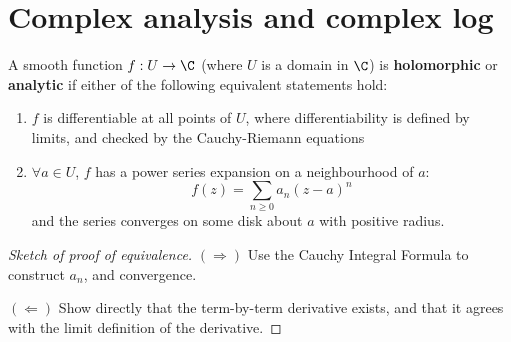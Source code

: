 \documentclass{article}
\begin{document}
\maketitle

\section{Complex analysis and complex log}

\begin{defi}
    A smooth function $f: U \to \C$ (where $U$ is a domain in $\C$) is \textbf{holomorphic} or \textbf{analytic} if either of the following equivalent statements hold:
    \begin{enumerate}[label=(\arabic*)]
        \item $f$ is differentiable at all points of $U$, where differentiability is defined by limits, and checked by the Cauchy-Riemann equations
        \item $\forall a \in U$, $f$ has a power series expansion on a neighbourhood of $a$:
            \begin{equation*}
                f(z) = \sum_{n \geq 0} a_n (z - a)^n
            \end{equation*}
            and the series converges on some disk about $a$ with positive radius.
    \end{enumerate}
\end{defi}
\begin{proof}[Sketch of proof of equivalence]

    \leavevmode

    $(\Rightarrow)$ Use the Cauchy Integral Formula to construct $a_n$, and convergence.

    $(\Leftarrow)$ Show directly that the term-by-term derivative exists, and that it agrees with the limit definition of the derivative.
\end{proof}
\end{document}

